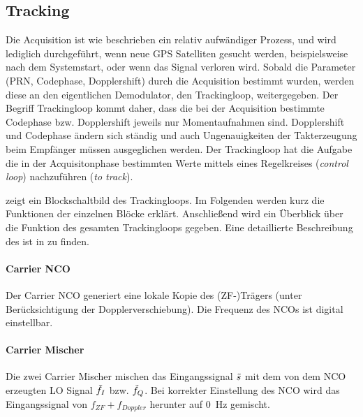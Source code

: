 \subsection{Tracking}
\label{GrundlagenTracking}
Die Acquisition ist wie beschrieben ein relativ aufwändiger Prozess, und wird lediglich durchgeführt, wenn neue GPS Satelliten gesucht werden, beispielsweise nach dem Systemstart, oder wenn das Signal verloren wird. Sobald die Parameter (PRN, Codephase, Dopplershift) durch die Acquisition bestimmt wurden, werden diese an den eigentlichen Demodulator, den Trackingloop, weitergegeben. Der Begriff Trackingloop kommt daher, dass die bei der Acquisition bestimmte Codephase bzw. Dopplershift jeweils nur Momentaufnahmen sind. Dopplershift und Codephase ändern sich ständig und auch Ungenauigkeiten der Takterzeugung beim Empfänger müssen ausgeglichen werden. Der Trackingloop hat die Aufgabe die in der Acquisitonphase bestimmten Werte mittels eines Regelkreises (\emph{control loop}) nachzuführen (\emph{to track}).


 zeigt ein Blockschaltbild des Trackingloops. Im Folgenden werden kurz die Funktionen der einzelnen Blöcke erklärt. Anschließend wird ein Überblick über die Funktion des gesamten Trackingloops gegeben. Eine detaillierte Beschreibung des ist in \cite{borre2007software} zu finden.

\paragraph{Carrier NCO} Der Carrier \gls{NCO} generiert eine lokale Kopie des (ZF-)Trägers (unter Berücksichtigung der Dopplerverschiebung). Die Frequenz des NCOs ist digital einstellbar.

\paragraph{Carrier Mischer} Die zwei Carrier Mischer mischen das Eingangssignal $\tilde{s}$ mit dem von dem NCO erzeugten \gls{LO} Signal $\tilde{f}_I$ bzw. $\tilde{f}_Q$. Bei korrekter Einstellung des NCO wird das Eingangssignal von  $f_{ZF}+f_{Doppler}$ herunter auf \SI{0}{\Hz} gemischt.

